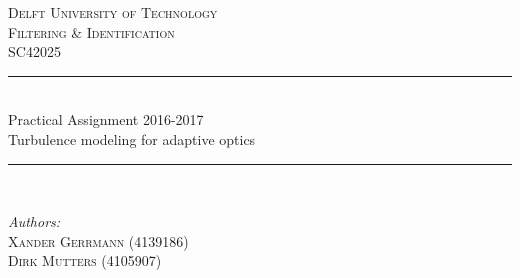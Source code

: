 \documentclass[11pt, oneside,a4paper,fleqn]{report}
\begin{document}
\begin{titlepage}

\newcommand{\HRule}{\rule{\linewidth}{0.5mm}} 

\center 
 

 

\textsc{\LARGE Delft University of Technology}\\[1.5cm] 
\textsc{\Large Filtering \& Identification}\\[0.5cm]
\textsc{\large SC42025}\\[0.5cm]


\HRule \\[0.4cm]
Practical Assignment 2016-2017\\ Turbulence modeling for adaptive optics{ \huge \bfseries }\\[0.4cm] 
\HRule \\[1.5cm]
 

\begin{minipage}{0.4\textwidth}
\begin{flushleft} \large
\emph{Authors:}\\
\textsc{Xander Gerrmann} (4139186)\\
\textsc{Dirk Mutters} (4105907)
\end{flushleft}
\end{minipage}
~
\begin{minipage}{0.4\textwidth}
\begin{flushright} \large
\emph{} \\
 \textsc{} %
\end{flushright}
\end{minipage}\\[1cm]



\end{titlepage}
\end{document}
